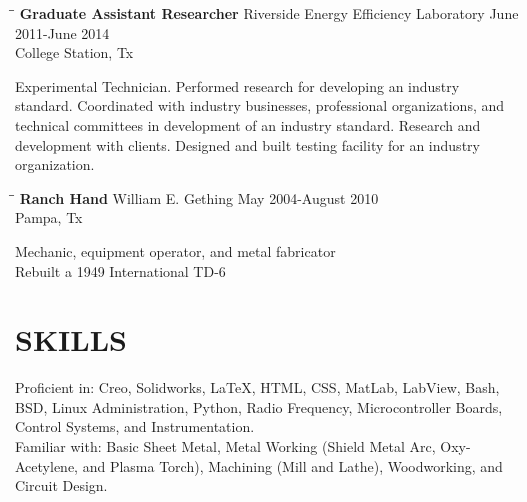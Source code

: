 \documentclass{res}
\begin{document}
\begin{resume}
   \begin{tabbing}
   \hspace{2.5in}\= \hspace{2.6in}\= \kill %
    {\bf Graduate Assistant Researcher} \>Riverside Energy Efficiency Laboratory     \>June 2011-June 2014\\
    	\>College Station, Tx
   \end{tabbing}\vspace{-20pt}      %
   	Experimental Technician. Performed research for developing an industry standard. Coordinated with industry businesses, professional organizations, and technical committees in development of an industry standard. Research and development with clients. Designed and built testing facility for an industry organization.
   \begin{tabbing}
   \hspace{2.5in}\= \hspace{2.6in}\= \kill %
    {\bf Ranch Hand} \>William E. Gething \> May 2004-August 2010 \\
                          \>Pampa, Tx
   \end{tabbing}\vspace{-20pt}
   Mechanic, equipment operator, and metal fabricator\\
   Rebuilt a 1949 International TD-6

\newpage

\section{SKILLS}          
	Proficient in: Creo, Solidworks, \LaTeX{}, HTML, CSS, MatLab, LabView, Bash, BSD, Linux Administration, Python, Radio Frequency, Microcontroller Boards, Control Systems, and Instrumentation.\\
    Familiar with: Basic Sheet Metal, Metal Working (Shield Metal Arc, Oxy-Acetylene, and Plasma Torch), Machining (Mill and Lathe), Woodworking, and Circuit Design.


\end{resume}
\end{document}
